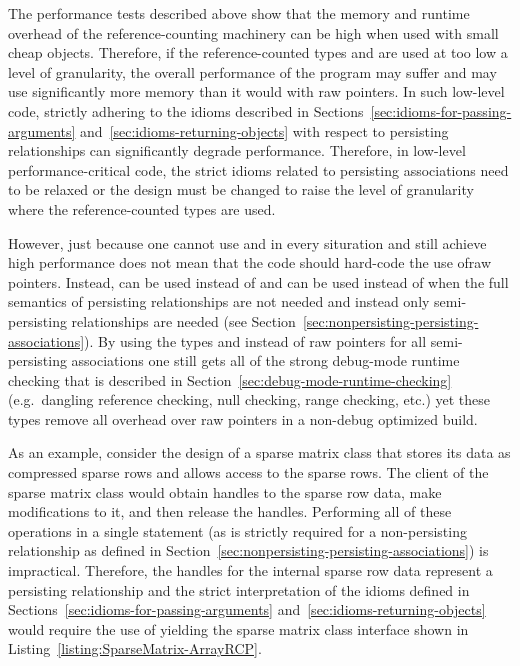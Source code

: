 \documentclass[pdf,ps2pdf,11pt]{SANDreport}
\begin{document}
The performance tests described above show that the memory and runtime
overhead of the reference-counting machinery can be high when used
with small cheap objects.  Therefore, if the reference-counted types
{} and {} are used at too low a level of
granularity, the overall performance of the program may suffer and may
use significantly more memory than it would with raw pointers.  In
such low-level code, strictly adhering to the idioms described in
Sections~\ref{sec:idioms-for-passing-arguments}
and~\ref{sec:idioms-returning-objects} with respect to persisting
relationships can significantly degrade performance.  Therefore, in
low-level performance-critical code, the strict idioms related to
persisting associations need to be relaxed or the design must be
changed to raise the level of granularity where the reference-counted
types are used.

However, just because one cannot use {} and {}
in every situration and still achieve high performance does not mean
that the code should hard-code the use ofraw pointers.  Instead,
{} can be used instead of {} and {}
can be used instead of {} when the full semantics of
persisting relationships are not needed and instead only
semi-persisting relationships are needed (see
Section~\ref{sec:nonpersisting-persisting-associations}).  By using
the types {} and {} instead of raw pointers
for all semi-persisting associations one still gets all of the strong
debug-mode runtime checking that is described in
Section~\ref{sec:debug-mode-runtime-checking} (e.g.\ dangling
reference checking, null checking, range checking, etc.) yet these
types remove all overhead over raw pointers in a non-debug optimized
build.

As an example, consider the design of a sparse matrix class that
stores its data as compressed sparse rows and allows access to the
sparse rows.  The client of the sparse matrix class would obtain
handles to the sparse row data, make modifications to it, and then
release the handles.  Performing all of these operations in a single
statement (as is strictly required for a non-persisting relationship
as defined in Section~\ref{sec:nonpersisting-persisting-associations})
is impractical.  Therefore, the handles for the internal sparse row
data represent a persisting relationship and the strict interpretation
of the idioms defined in
Sections~\ref{sec:idioms-for-passing-arguments}
and~\ref{sec:idioms-returning-objects} would require the use of
{} yielding the sparse matrix class interface shown in
Listing~\ref{listing:SparseMatrix-ArrayRCP}.
\end{document}
